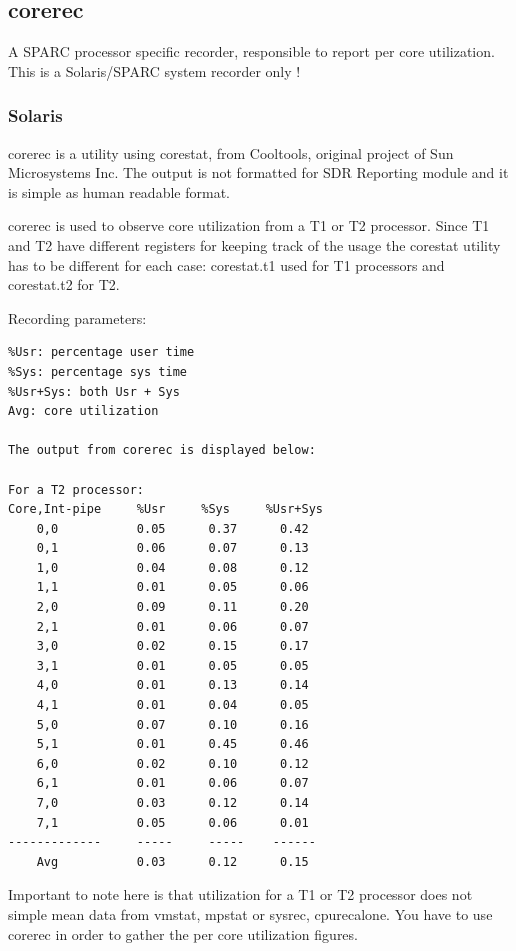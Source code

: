 \subsection*{corerec}
A SPARC processor specific recorder, responsible to report per core
utilization. This is a Solaris/SPARC system recorder only !

\subsubsection{Solaris}
corerec is a utility using corestat, from Cooltools, original project of
Sun Microsystems Inc. The output is not formatted for SDR Reporting module 
and it is simple as human readable format.

corerec is used to observe core utilization from a T1 or T2 processor. Since T1
and T2 have different registers for keeping track of the usage the corestat
utility has to be different for each case: corestat.t1 used for T1 processors
and corestat.t2 for T2. 

\noindent
Recording parameters:

\begin{verbatim}
%Usr: percentage user time
%Sys: percentage sys time
%Usr+Sys: both Usr + Sys
Avg: core utilization

The output from corerec is displayed below:

For a T2 processor:
Core,Int-pipe     %Usr     %Sys     %Usr+Sys 
    0,0           0.05      0.37      0.42 
    0,1           0.06      0.07      0.13 
    1,0           0.04      0.08      0.12 
    1,1           0.01      0.05      0.06 
    2,0           0.09      0.11      0.20 
    2,1           0.01      0.06      0.07 
    3,0           0.02      0.15      0.17 
    3,1           0.01      0.05      0.05 
    4,0           0.01      0.13      0.14 
    4,1           0.01      0.04      0.05 
    5,0           0.07      0.10      0.16 
    5,1           0.01      0.45      0.46 
    6,0           0.02      0.10      0.12 
    6,1           0.01      0.06      0.07 
    7,0           0.03      0.12      0.14 
    7,1           0.05      0.06      0.01 
-------------     -----     -----    ------ 
    Avg           0.03      0.12      0.15 

\end{verbatim}

Important to note here is that utilization for a T1 or T2 processor does not
simple mean data from vmstat, mpstat or sysrec, cpurecalone. You have to use 
corerec in order to gather the per core utilization figures. 



